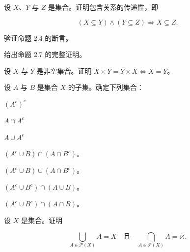 \exerciseshead

\begin{exercises}
\item

设 $X$、$Y$ 与 $Z$ 是集合。证明包含关系的传递性，即

\[
(X\subseteq Y)\land(Y\subseteq Z)\Rightarrow X\subseteq Z.
\]
\item

验证命题 2.4 的断言。

\item

给出命题 2.7 的完整证明。

\item

设 $X$ 与 $Y$ 是非空集合。证明 $ X \times Y = Y \times X \Leftrightarrow X = Y $。

\item

设 $A$ 与 $B$ 是集合 $X$ 的子集。确定下列集合：

\begin{items}
\item

$ (A^{c})^{c} $

\item

$ A \cap A^{c} $

\item

$ A \cup A^{c} $

\item

$ (A^{c} \cup B) \cap (A \cap B^{c}) $。

\item

$ (A^{c} \cup B) \cup (A \cap B^{c}) $。

\item

$ (A^{c} \cup B^{c}) \cap (A \cup B) $。

\item

$ (A^{c} \cup B^{c}) \cap (A \cap B) $。

\end{items}

\item

设 $X$ 是集合。证明

\[
\bigcup_{A\in\mathcal{P}(X)}A=X\quad\text{且}\quad\bigcap_{A\in\mathcal{P}(X)}A=\varnothing.
\]
\item


\end{exercises}
